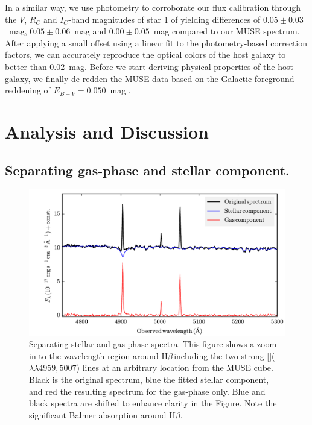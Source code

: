 \documentclass[traditabstract]{aa}
\newcommand{\hb}{H$\beta$}
\newcommand{\oiii}{[\ion{O}{iii}]}
\begin{document}
In a similar way, we use photometry to corroborate our flux calibration through the $V$, $R_C$ and $I_C$-band magnitudes of star 1 of \citet{2011AJ....141..163C} yielding differences of $0.05\pm0.03$~mag, $0.05\pm0.06$~mag and $0.00\pm0.05$~mag compared to our MUSE spectrum. After applying a small offset using a linear fit to the photometry-based correction factors, we can accurately reproduce the optical colors of the host galaxy \citep{2005NewA...11..103S} to better than 0.02~mag. Before we start deriving physical properties of the host galaxy, we finally de-redden the MUSE data based on the Galactic foreground reddening of $E_{B-V}=0.050$~mag \citep{2011ApJ...737..103S}. 


\section{Analysis and Discussion}

\subsection{Separating gas-phase and stellar component.}

\begin{figure}
\includegraphics[angle=0, width=0.99\columnwidth]{Figs/Stargas_spec.pdf}
\caption{Separating stellar and gas-phase spectra. This figure shows a zoom-in to the wavelength region around \hb\,including the two strong \oiii($\lambda\lambda4959,5007$) lines at an arbitrary location from the MUSE cube. Black is the original spectrum, blue the fitted stellar component, and red the resulting spectrum for the gas-phase only. Blue and black spectra are shifted to enhance clarity in the Figure. Note the significant Balmer absorption around \hb.}
\label{fig:stargas}
\end{figure}
\end{document}

